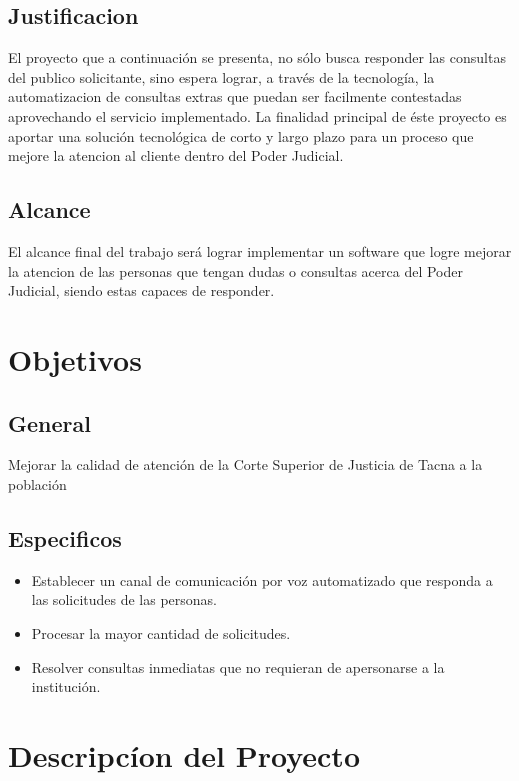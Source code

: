\documentclass[twoside,twocolumn]{article}
\begin{document}
\subsection{Justificacion}
El proyecto que a continuación se presenta, no sólo busca responder las consultas del publico solicitante, sino espera lograr,
a través de la tecnología, la automatizacion de consultas extras que puedan ser facilmente contestadas aprovechando el servicio implementado.
La finalidad principal de éste proyecto es aportar una solución tecnológica de corto y largo plazo para un proceso que mejore la atencion al cliente
dentro del Poder Judicial.

\subsection{Alcance}
El alcance final del trabajo será lograr implementar un
software que logre mejorar la atencion de las personas que tengan dudas o consultas acerca del Poder Judicial, siendo estas capaces de responder.

\section{Objetivos}
\subsection{General}
Mejorar la calidad de atención de la Corte Superior de Justicia de Tacna a la población

\subsection{Especificos}
\begin{itemize}
\item Establecer un canal de comunicación por voz automatizado que responda a las solicitudes de las personas.
\item Procesar la mayor cantidad de solicitudes.
\item Resolver consultas inmediatas que no requieran de apersonarse a la institución.
\end{itemize}

\section{Descripcíon del Proyecto}
\end{document}
